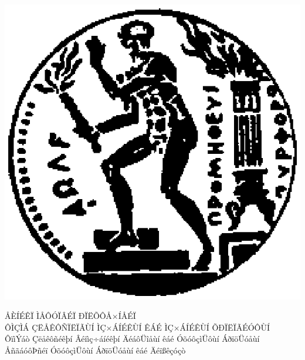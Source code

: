 \documentclass[12pt, twoside, a4paper]{book}
\begin{document}
\maketitle
\newpage
\thispagestyle{empty}
\hspace{10pt}
\newpage
\thispagestyle{empty}
\vspace{-6ex}
\begin{center}
\includegraphics[scale=1]{pyrforos.eps}

\Large{Å}\large{ÈÍÉÊÏ}
\Large{Ì}\large{ÅÔÓÏÂÉÏ}
\Large{Ð}\large{ÏËÕÔÅ×ÍÅÉÏ} \\
\normalsize{Ô}\small{ÌÇÌÁ}
\normalsize{Ç}\small{ËÅÊÔÑÏËÏÃÙÍ}
\normalsize{Ì}\small{Ç×ÁÍÉÊÙÍ}
\normalsize{Ê}\small{ÁÉ}
\normalsize{Ì}\small{Ç×ÁÍÉÊÙÍ}
\normalsize{Õ}\small{ÐÏËÏÃÉÓÔÙÍ} \\
\vspace{2ex}
ÔïìÝáò Çëåêôñéêþí Âéïìç÷áíéêþí ÄéáôÜîåùí êáé ÓõóôçìÜôùí ÁðïöÜóåùí \\
ÅñãáóôÞñéï ÓõóôçìÜôùí ÁðïöÜóåùí êáé Äéïßêçóçò
\end{center}
\end{document}
